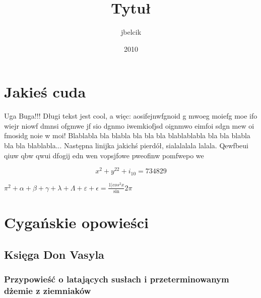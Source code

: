 \documentclass[12pt]{article}
\title{Tytuł}
\author{jbelcik}
\date{2010}
\begin{document}
\maketitle

\section{Jakieś cuda}

Uga Buga!!! Długi tekst jest cool, a więc: aosifejnwfgnoid g mwoeg moiefg moe ifo wiejr niowf dmnsi ofgmwe jf sio dgnmo iwemkiofjsd oignmwo eimfoi sdgn mew oi fmosidg noie w moi! Blablabla bla blabla bla bla bla blablablabla bla bla blabla bla bla blablabla...
\noindent Następna linijka jakichś pierdół, sialalalala lalala. Qewfbeui qiuw qbw qwui dfogij edn wen vopsjfowe pweofinw pomfwepo we

\[ x^2 + y^{22} + i_{10} = 734829 \]

$\pi^2 + \alpha + \beta + \gamma + \lambda +\Lambda + \varepsilon + \epsilon = \frac{1 | cos^2 x}\sin2\pi$

\section{Cygańskie opowieści}

\subsection{Księga Don Vasyla}

\subsubsection{Przypowieść o latających susłach i przeterminowanym dżemie z ziemniaków}
\end{document}
